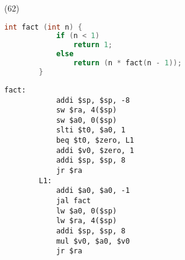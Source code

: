 \item \begin{theorem}{(62)} \quad\quad \begin{lstlisting}[language={C}]
        int fact (int n) {
            if (n < 1)
                return 1;
            else
                return (n * fact(n - 1));            
        }
    \end{lstlisting}
    \begin{lstlisting}[language={[x86masm]Assembler}]
        fact:
            addi $sp, $sp, -8
            sw $ra, 4($sp)
            sw $a0, 0($sp)
            slti $t0, $a0, 1
            beq $t0, $zero, L1
            addi $v0, $zero, 1
            addi $sp, $sp, 8
            jr $ra
        L1:
            addi $a0, $a0, -1
            jal fact
            lw $a0, 0($sp)
            lw $ra, 4($sp)
            addi $sp, $sp, 8
            mul $v0, $a0, $v0
            jr $ra
    \end{lstlisting}
\end{theorem}
